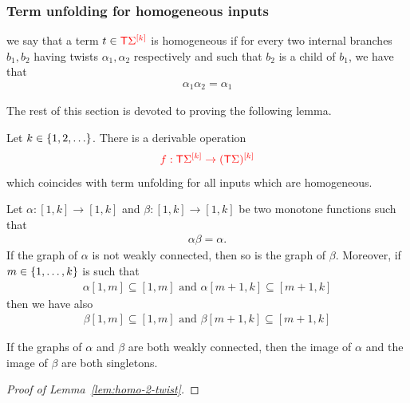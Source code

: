\subsubsection{Term unfolding for homogeneous inputs}
\label{subsec:something-homo-unfold}
we say that a term $ t \in \tmonad \mati k \rSigma$ is homogeneous if for every two internal branches $b_1, b_2$ having twists $\alpha_1, \alpha_2$ respectively and such that $b_2$ is a child of $b_1$, we have that
\begin{align*}
\alpha_1\alpha_2=\alpha_1
\end{align*}

The rest of this section is devoted to proving the following lemma. 

\begin{lemma}\label{lem:homo-2-twist}
    Let $k \in \set{1,2,\ldots}$. There is a derivable operation 
    \begin{align*}
        \ranked{f : \tmonad \mati k \rSigma \to \mati k {(\tmonad \Sigma)} }
        \end{align*}      
which coincides with term unfolding for all inputs which are homogeneous.
\end{lemma}

\begin{lemma}
Let $\alpha:[1,k]\to [1,k]$ and $\beta:[1,k]\to [1,k]$ be two monotone functions such that
\begin{align*}
\alpha\beta=\alpha.
\end{align*}
 If the graph of $\alpha$ is not weakly connected, then so is the graph of $\beta$. Moreover, if $m\in \set{1,\dots, k}$ is such that 
\begin{align*}
\alpha[1,m] \subseteq [1,m]  \text{ and } 
\alpha[m+1,k]\subseteq [m+1,k]
\end{align*}
then we have also 
\begin{align*}
\beta[1,m]\subseteq [1,m] \text{ and }
\beta[m+1,k]\subseteq [m+1,k]
\end{align*}

 If the graphs of $\alpha$ and $\beta$ are both weakly connected, then the image of $\alpha$ and the image of $\beta$ are both singletons.
\end{lemma}

\begin{proof}[Proof of Lemma~\ref{lem:homo-2-twist}]

\end{proof}
